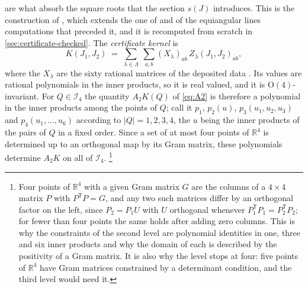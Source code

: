 \documentclass[11pt,reqno]{amsart}
\renewcommand{\_}{\origunderscore\allowbreak}
\numberwithin{equation}{section}
\theoremstyle{plain}
\theoremstyle{definition}
\theoremstyle{remark}
\begin{document}
are what absorb the square roots that the section $s(J)$ introduces. This
is the construction of \cite{LLM24}, which extends the one of
\cite{dLV15} and of the equiangular lines computations that preceded it,
and it is recomputed from scratch in \cref{sec:certificate-checked}. The
\emph{certificate kernel} is
\begin{equation}\label{eq:Kcert}
  K(J_1,J_2)\;=\;\sum_{\lambda\in\Lambda}\ \sum_{a,b}(X_\lambda)_{ab}\,Z_\lambda(J_1,J_2)_{ab},
\end{equation}
where the $X_\lambda$ are the sixty rational matrices of the deposited
data \cite{LLM24data}. Its values are rational polynomials in the inner
products, so it is real valued, and it is $\mathrm O(4)$-invariant. For
$Q\in\mathcal I_4$ the quantity $A_2K(Q)$ of \eqref{eq:A2} is therefore a
polynomial in the inner products among the points of $Q$; call it
$p_1$, $p_2(u)$, $p_3(u_1,u_2,u_3)$ and $p_4(u_1,\dots,u_6)$ according
to $|Q|=1,2,3,4$, the $u$ being the inner products of the pairs of $Q$ in a
fixed order. Since a set of at most four points of $\mathbb R^4$ is
determined up to an orthogonal map by its Gram matrix, these polynomials
determine $A_2K$ on all of $\mathcal I_4$.%
\footnote{Four points of $\mathbb R^4$ with a given Gram matrix $G$ are
  the columns of a $4\times4$ matrix $P$ with $P^{\mathsf T}P=G$, and any
  two such matrices differ by an orthogonal factor on the left, since
  $P_2=P_1U$ with $U$ orthogonal whenever $P_1^{\mathsf T}P_1=P_2^{\mathsf
  T}P_2$; for fewer than four points the same holds after adding zero
  columns. This is why the constraints of the second level are
  polynomial identities in one, three and six inner products and why
  the domain of each is described by the positivity of a Gram matrix.
  It is also why the level stops at four: five points of $\mathbb R^4$
  have Gram matrices constrained by a determinant condition, and the
  third level would need it.}
\end{document}
